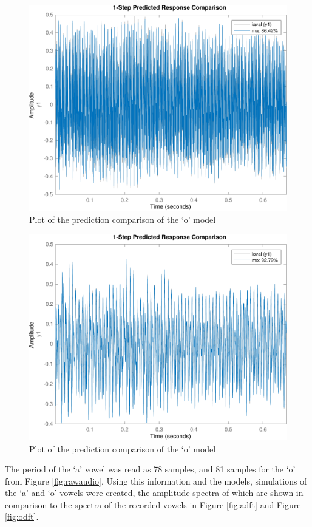\documentclass{IEEEtran}
\begin{document}
\begin{figure}[h!]
    \centering
    \captionsetup{justification=centering}
    \includegraphics[width=0.8\columnwidth]{pictures/compare_a.pdf}
    \caption{Plot of the prediction comparison of the `o' model}
    \label{fig:comparea}
\end{figure}

\begin{figure}[h!]
    \centering
    \captionsetup{justification=centering}
    \includegraphics[width=0.8\columnwidth]{pictures/compare_o.pdf}
    \caption{Plot of the prediction comparison of the `o' model}
    \label{fig:compareo}
\end{figure}

The period of the `a' vowel was read as 78 samples, and 81 samples for the `o'
from Figure \ref{fig:rawaudio}. Using this information and the models,
simulations of the `a' and `o' vowels were created, the amplitude spectra of
which are shown in comparison to the spectra of the recorded vowels in Figure
\ref{fig:adft} and Figure \ref{fig:odft}.
\end{document}
